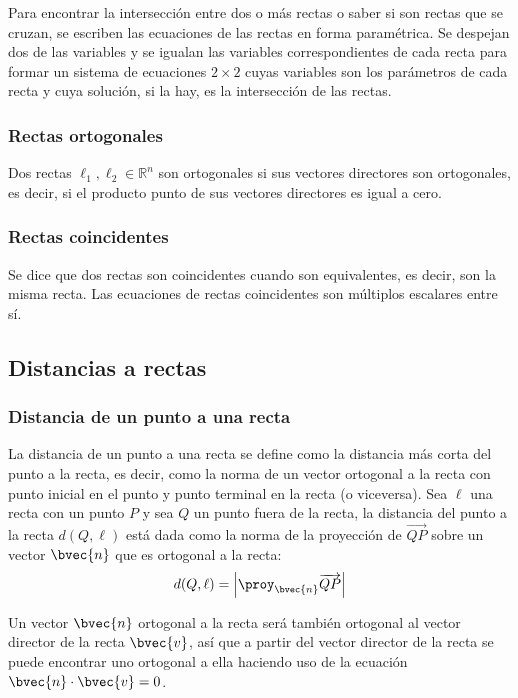 \documentclass{fmbnotes}
\begin{document}
Para encontrar la intersección entre dos o más rectas o saber si son rectas que se cruzan, se escriben las ecuaciones de las rectas en forma paramétrica. Se despejan dos de las variables y se igualan las variables correspondientes de cada recta para formar un sistema de ecuaciones \( 2 \times 2 \) cuyas variables son los parámetros de cada recta y cuya solución, si la hay, es la intersección de las rectas.

\subsubsection{ Rectas ortogonales}

Dos rectas \( \ell_{1}, \ell_{2} \in \mathbb{R}^{n} \) son ortogonales si sus vectores directores son ortogonales, es decir, si el producto punto de sus vectores directores es igual a cero.

\subsubsection{Rectas coincidentes}

Se dice que dos rectas son coincidentes cuando son equivalentes, es decir, son la misma recta. Las ecuaciones de rectas coincidentes son múltiplos escalares entre sí.

\subsection{ Distancias a rectas}
\subsubsection{ Distancia de un punto a una recta}
La distancia de un punto a una recta se define como la distancia más corta del punto a la recta, es decir, como la norma de un vector ortogonal a la recta con punto inicial en el punto y punto terminal en la recta (o viceversa). Sea \( \ell \) una recta con un punto \( P \) y sea \( Q \) un punto fuera de la recta, la distancia del punto a la recta \( d(Q, \ell) \) está dada como la norma de la proyección de \( \overrightarrow{Q P} \) sobre un vector \( \bvec{n} \) que es ortogonal a la recta:
\[ d(Q, \ell)=\left|\proy_{\bvec{n}} \overrightarrow{Q P}\right| \]

Un vector \( \bvec{n} \) ortogonal a la recta será también ortogonal al vector director de la recta \( \bvec{v} \), así que a partir del vector director de la recta se puede encontrar uno ortogonal a ella haciendo uso de la ecuación \( \bvec{n} \cdot \bvec{v}=0 \).
\end{document}
